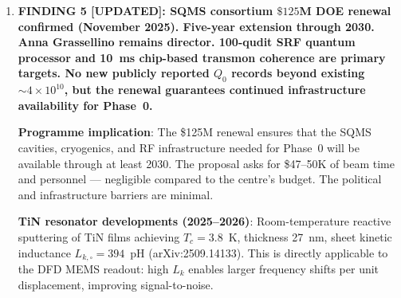 \documentclass[11pt]{article}
\newcommand{\ee}[1]{\times 10^{#1}}
\theoremstyle{definition}
\theoremstyle{remark}
\begin{document}
\begin{tcolorbox}[colback=blue!5!white, colframe=blue!60!black,
  title=\textbf{W4i19 P11: EM COUPLING / DETECTION --- 5 KEY RESULTS},
  breakable]
\begin{enumerate}
  Rationale for TiN PRIMARY over Si$_3$N$_4$ SECONDARY:
  \begin{itemize}[nosep]
  \item TiN is superconducting ($T_c = 0.6$--$4.5$~K tunable);
    Si$_3$N$_4$ is insulating.
  \item TiN enables kinetic inductance readout (all-electrical,
    no optical access needed in cryostat); Si$_3$N$_4$ requires
    optical interferometry or piezoelectric transduction.
  \item TiN PnC membranes demonstrated $Q_m = 8\ee{6}$ with
    clear path to $>10^9$ via bandgap isolation at mK temperatures.
  \item Si$_3$N$_4$ achieved $Q_m > 10^9$ at room temperature but
    mK performance is saturated at $\sim 10^8$ for standard designs;
    requires new PnC architectures.
  \item Both materials available from established suppliers
    (TiN: JPL/Caltech sputtering, NIST ALD; Si$_3$N$_4$: Norcada,
    Atomica commercial membranes).
  \end{itemize}

  \textbf{Si$_3$N$_4$ 2025--2026 developments}:
  Centimeter-scale Si$_3$N$_4$ resonators with $Q \times f > 10^{14}$~Hz
  at room temperature (arXiv:2308.00611). Membrane phononic crystals
  adapted to piezoelectric AlN for MHz-frequency high-$Q_m$ defect
  modes (APL 126, 253503, 2025). Hybrid hBN/Si$_3$N$_4$ resonators
  demonstrated mode hybridization shifting $Q$ by orders of magnitude.

\item \textbf{FINDING 5 [UPDATED]: SQMS consortium $\$125$M DOE
  renewal confirmed (November 2025). Five-year extension through
  2030. Anna Grassellino remains director. 100-qudit SRF quantum
  processor and 10~ms chip-based transmon coherence are primary
  targets. No new publicly reported $Q_0$ records beyond existing
  $\sim 4\ee{10}$, but the renewal guarantees continued infrastructure
  availability for Phase~0.}

  \textbf{Programme implication}: The \$125M renewal ensures that
  the SQMS cavities, cryogenics, and RF infrastructure needed for
  Phase~0 will be available through at least 2030. The proposal
  asks for \$47--50K of beam time and personnel --- negligible
  compared to the centre's budget. The political and infrastructure
  barriers are minimal.

  \textbf{TiN resonator developments (2025--2026)}: Room-temperature
  reactive sputtering of TiN films achieving $T_c = 3.8$~K,
  thickness 27~nm, sheet kinetic inductance $L_{k,\square} = 394$~pH
  (arXiv:2509.14133). This is directly applicable to the DFD MEMS
  readout: high $L_k$ enables larger frequency shifts per unit
  displacement, improving signal-to-noise.

\end{enumerate}

\end{tcolorbox}
\end{document}
